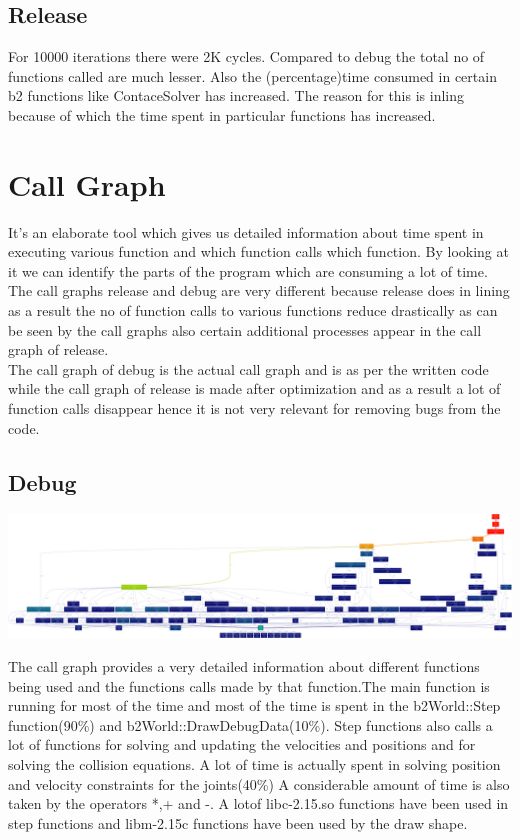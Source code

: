 \documentclass[11pt]{article}
\begin{document}
\subsection{Release}
For 10000 iterations there were 2K cycles. Compared to debug the total no of functions called are much lesser. Also the (percentage)time consumed in certain b2 functions like ContaceSolver has increased. The reason for this is inling because of which the time spent in particular functions has increased.
\section{Call Graph}
It's an elaborate tool which gives us detailed information about time spent in executing various function and which function calls which function. By looking at it we can identify the parts of the program which are consuming a lot of time.\\
The call graphs release and debug are very different because release does in lining as a result the no of function calls to various functions reduce drastically as can be seen by the call graphs also certain additional processes appear in the call graph of release.\\
The call graph of debug is the actual call graph and is as per the written code while the call graph of release is made after optimization and as a result a lot of function calls disappear hence it is not very relevant for removing bugs from the code.
\subsection{Debug}
\begin{center}
	\includegraphics[scale=0.06]{debug}
\end{center}
The call graph provides a very detailed information about different functions being used and the functions calls made by that function.The main function is running for most of the time and most of the time is spent in the b2World::Step function(90\%) and b2World::DrawDebugData(10\%). Step functions also calls a lot of functions for solving and updating the velocities and positions and for solving the collision equations. A lot of time is actually spent in solving position and velocity constraints for the joints(40\%) A considerable amount of time is also taken by the operators *,+ and -. A lotof libc-2.15.so functions have been used in step functions and libm-2.15c functions have been used by the draw shape.
\end{document}
